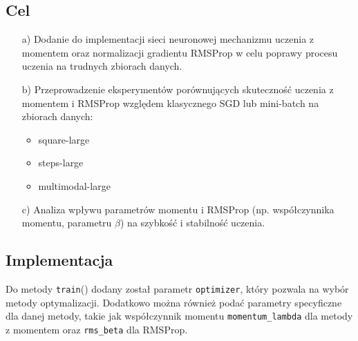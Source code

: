 \documentclass{article}
\begin{document}
\subsection*{Cel}
\begin{enumerate}
    \item[a)] Dodanie do implementacji sieci neuronowej mechanizmu uczenia z momentem oraz normalizacji gradientu RMSProp w celu poprawy procesu uczenia na trudnych zbiorach danych.
    \item[b)] Przeprowadzenie eksperymentów porównujących skuteczność uczenia z momentem i RMSProp względem klasycznego SGD lub mini-batch na zbiorach danych:
    \begin{itemize}
        \item square-large
        \item steps-large
        \item multimodal-large
    \end{itemize}
    \item[c)] Analiza wpływu parametrów momentu i RMSProp (np. współczynnika momentu, parametru $\beta$) na szybkość i stabilność uczenia.
\end{enumerate}

\subsection*{Implementacja}
Do metody \texttt{train}() dodany został parametr \texttt{optimizer}, który pozwala na wybór metody optymalizacji. Dodatkowo można również podać parametry specyficzne dla danej metody, takie jak współczynnik momentu \texttt{momentum\_lambda} dla metody z momentem oraz \texttt{rms\_beta} dla RMSProp.
\end{document}
